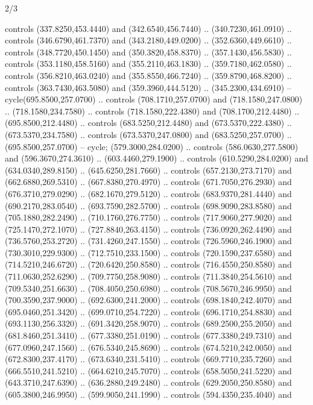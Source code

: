 \begin{flagdescription}{2/3}
\begin{scope}[xshift=0.5\flaglength,yshift=0.5\flagwidth,scale=\flagwidth/255]
\begin{scope}[y=-0.43pt, x=0.43pt,xshift=-193pt,yshift=133pt]
\begin{scope}[draw=black,line width=0.003\flagwidth]
\begin{scope}[fill=white]
  controls (337.8250,453.4440) and (342.6540,456.7440) .. (340.7230,461.0910) ..
  controls (346.6790,461.7370) and (343.2180,449.0200) .. (352.6360,449.6610) ..
  controls (348.7720,450.1450) and (350.3820,458.8370) .. (357.1430,456.5830) ..
  controls (353.1180,458.5160) and (355.2110,463.1830) .. (359.7180,462.0580) ..
  controls (356.8210,463.0240) and (355.8550,466.7240) .. (359.8790,468.8200) ..
  controls (363.7430,463.5080) and (359.3960,444.5120) .. (345.2300,434.6910) --
  cycle(695.8500,257.0700) .. controls (708.1710,257.0700) and
  (718.1580,247.0800) .. (718.1580,234.7580) .. controls (718.1580,222.4380) and
  (708.1700,212.4480) .. (695.8500,212.4480) .. controls (683.5250,212.4480) and
  (673.5370,222.4380) .. (673.5370,234.7580) .. controls (673.5370,247.0800) and
  (683.5250,257.0700) .. (695.8500,257.0700) -- cycle;
 (579.3000,284.0200) .. controls (586.0630,277.5800) and
  (596.3670,274.3610) .. (603.4460,279.1900) .. controls (610.5290,284.0200) and
  (634.0340,289.8150) .. (645.6250,281.7660) .. controls (657.2130,273.7170) and
  (662.6880,269.5310) .. (667.8380,270.4970) .. controls (671.7050,276.2930) and
  (676.3710,279.0290) .. (682.1670,279.5120) .. controls (683.9370,281.4440) and
  (690.2170,283.0540) .. (693.7590,282.5700) .. controls (698.9090,283.8580) and
  (705.1880,282.2490) .. (710.1760,276.7750) .. controls (717.9060,277.9020) and
  (725.1470,272.1070) .. (727.8840,263.4150) .. controls (736.0920,262.4490) and
  (736.5760,253.2720) .. (731.4260,247.1550) .. controls (726.5960,246.1900) and
  (730.3010,229.9300) .. (712.7510,233.1500) .. controls (720.1590,237.6580) and
  (714.5210,246.6720) .. (720.6420,250.8580) .. controls (716.4550,250.8580) and
  (711.0630,252.6290) .. (709.7750,258.9080) .. controls (711.3840,254.5610) and
  (709.5340,251.6630) .. (708.4050,250.6980) .. controls (708.5670,246.9950) and
  (700.3590,237.9000) .. (692.6300,241.2000) .. controls (698.1840,242.4070) and
  (695.0460,251.3420) .. (699.0710,254.7220) .. controls (696.1710,254.8830) and
  (693.1130,256.3320) .. (691.3420,258.9070) .. controls (689.2500,255.2050) and
  (681.8460,251.3410) .. (677.3380,251.0190) .. controls (677.3380,249.7310) and
  (677.0960,247.1560) .. (676.5340,245.8690) .. controls (674.5210,242.0050) and
  (672.8300,237.4170) .. (673.6340,231.5410) .. controls (669.7710,235.7260) and
  (666.5510,241.5210) .. (664.6210,245.7070) .. controls (658.5050,241.5220) and
  (643.3710,247.6390) .. (636.2880,249.2480) .. controls (629.2050,250.8580) and
  (605.3800,246.9950) .. (599.9050,241.1990) .. controls (594.4350,235.4040) and

\end{scope}
\end{scope}
\end{scope}
\end{scope}
\end{flagdescription}
